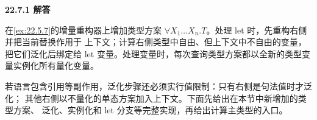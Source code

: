 \begin{taplsolutionentrybox}
\label{sol:translator:22.7.1}
\textbf{22.7.1 解答}

在\cref{ex:22.5.7}的增量重构器上增加类型方案
\(\forall X_1\ldots X_n.T\)。处理 let 时，先重构右侧并把当前替换作用于
上下文；计算右侧类型中自由、但上下文中不自由的变量，把它们泛化后绑定给
let 变量。处理变量时，每次查询类型方案都以全新的类型变量实例化所有量化变量。

若语言包含引用等副作用，泛化步骤还必须实行值限制：只有右侧是句法值时才泛化；
其他右侧以不量化的单态方案加入上下文。下面先给出在本节中新增加的类型方案、
泛化、实例化和 let 分支等完整实现，再给出计算主类型的入口。

\end{taplsolutionentrybox}
